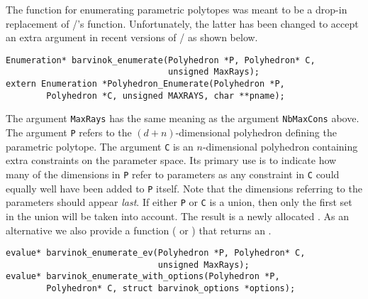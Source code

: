 The function  for enumerating
parametric polytopes was meant to be
a drop-in replacement of \PolyLib/'s 
function.
Unfortunately, the latter has been changed to
accept an extra argument in recent versions of \PolyLib/ as shown below.
\begin{verbatim}
Enumeration* barvinok_enumerate(Polyhedron *P, Polyhedron* C, 
                                unsigned MaxRays);
extern Enumeration *Polyhedron_Enumerate(Polyhedron *P,
	    Polyhedron *C, unsigned MAXRAYS, char **pname);
\end{verbatim}
The argument \verb+MaxRays+ has the same meaning as the argument
\verb+NbMaxCons+ above.
The argument \verb+P+ refers to the $(d+n)$-dimensional
polyhedron defining the parametric polytope.
The argument \verb+C+ is an $n$-dimensional polyhedron containing
extra constraints on the parameter space.
Its primary use is to indicate how many of the dimensions
in \verb+P+ refer to parameters as any constraint in \verb+C+
could equally well have been added to \verb+P+ itself.
Note that the dimensions referring to the parameters should
appear {\em last}.
If either \verb+P+ or \verb+C+ is a union,
then only the first set in the union will be taken into account.
The result is a newly allocated .
As an alternative we also provide a function 
( or
) that returns
an .
\begin{verbatim}
evalue* barvinok_enumerate_ev(Polyhedron *P, Polyhedron* C, 
                              unsigned MaxRays);
evalue* barvinok_enumerate_with_options(Polyhedron *P,
        Polyhedron* C, struct barvinok_options *options);
\end{verbatim}

